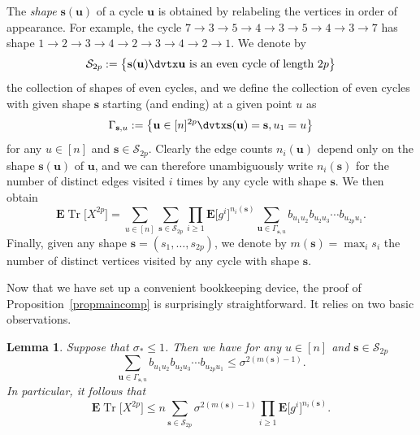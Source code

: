 \documentclass[aop,MSNbibl,dvips]{arximspdf}
\newtheorem{lem}[teo]{Lemma}
\newcommand{\EE}{\mathbf{E}}
\newcommand{\Tr}{\operatorname{Tr}}
\begin{document}
The \emph{shape} $\mathbf{s}(\mathbf{u})$ of a cycle $\mathbf{u}$ is
obtained by relabeling the vertices in order of appearance. For example,
the cycle $7\to3\to5\to4\to3\to5\to4\to3\to7$
has shape $1\to2\to3\to4\to2\to3\to4\to2\to1$.
We denote by
%
\[
\mathcal{S}_{2p}:=\bigl\{\mathbf{s}(\mathbf{u})\dvtx \mathbf{u}\mbox{
is an
even cycle of length }2p\bigr\} %
\]
%
the collection of shapes of even cycles, and we define the collection of
even cycles with given shape $\mathbf{s}$ starting (and ending) at a given
point $u$ as
%
\[
\Gamma_{\mathbf{s},u} := \bigl\{\mathbf{u}\in[n]^{2p}\dvtx \mathbf{s}(
\mathbf{u})=\mathbf{s}, u_1=u\bigr\} %
\]
%
for any $u\in[n]$ and $\mathbf{s}\in\mathcal{S}_{2p}$. Clearly the edge
counts $n_i(\mathbf{u})$ depend only on the shape $\mathbf{s}(\mathbf{u})$
of $\mathbf{u}$, and we can therefore unambiguously write
$n_i(\mathbf{s})$ for the number of distinct edges visited $i$ times by
any cycle with shape $\mathbf{s}$. We then obtain
%
\[
\EE\Tr\bigl[X^{2p}\bigr] = \sum_{u\in[n]} \sum
_{\mathbf{s}\in\mathcal{S}_{2p}} \prod_{i\ge1}\EE
\bigl[g^{i}\bigr]^{n_i(\mathbf{s})} \sum_{\mathbf{u}\in\Gamma_{\mathbf{s},u}}
b_{u_1u_2}b_{u_2u_3}\cdots b_{u_{2p}u_1}. %
\]
%
Finally, given any shape $\mathbf{s}=(s_1,\ldots,s_{2p})$, we denote by
$m(\mathbf{s})=\max_is_i$ the number of distinct vertices visited by any
cycle with shape $\mathbf{s}$.

Now that we have set up a convenient bookkeeping device, the proof of
Proposition~\ref{propmaincomp} is surprisingly straightforward.
It relies on two basic observations.

%
\begin{lem}
\label{lemcomp1}
Suppose that $\sigma_*\le1$. Then we have for any
$u\in[n]$ and $\mathbf{s}\in\mathcal{S}_{2p}$
%
\[
\sum_{\mathbf{u}\in\Gamma_{\mathbf{s},u}} b_{u_1u_2}b_{u_2u_3}\cdots
b_{u_{2p}u_1} \le\sigma^{2(m(\mathbf{s})-1)}. %
\]
%
In particular, it follows that
%
\[
\EE\Tr\bigl[X^{2p}\bigr] \le n \sum_{\mathbf{s}\in\mathcal{S}_{2p}}
\sigma^{2(m(\mathbf{s})-1)} \prod_{i\ge1}\EE
\bigl[g^{i}\bigr]^{n_i(\mathbf{s})}. %
\]
%
\end{lem}
\end{document}

